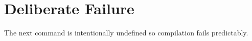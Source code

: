 \section{Deliberate Failure}
The next command is intentionally undefined so compilation fails predictably.
\FixtureCommandThatMustNotExist

